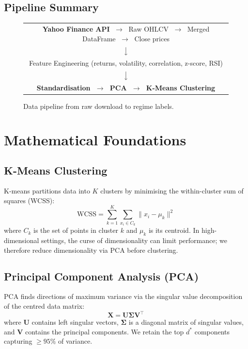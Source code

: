 \documentclass[11pt, a4paper]{article}
\begin{document}
\subsection{Pipeline Summary}

\begin{figure}[H]
\centering
\small
\renewcommand{\arraystretch}{1.2}
\begin{tabular}{c}
\toprule
\textbf{Yahoo Finance API} $\;\to\;$ Raw OHLCV $\;\to\;$ Merged DataFrame $\;\to\;$ Close prices \\
$\big\downarrow$ \\
Feature Engineering (returns, volatility, correlation, z-score, RSI) \\
$\big\downarrow$ \\
\textbf{Standardisation $\;\to\;$ PCA $\;\to\;$ K-Means Clustering} \\
\bottomrule
\end{tabular}
\caption{Data pipeline from raw download to regime labels.}
\label{fig:pipeline}
\end{figure}

\section{Mathematical Foundations}

\subsection{K-Means Clustering}
K-means partitions data into $K$ clusters by minimising the within-cluster sum of squares (WCSS):
\begin{equation}
\label{eq:wcss}
\text{WCSS} = \sum_{k=1}^{K} \sum_{x_i \in C_k} \| x_i - \mu_k \|^2
\end{equation}
where $C_k$ is the set of points in cluster $k$ and $\mu_k$ is its centroid. In high-dimensional settings, the curse of dimensionality can limit performance; we therefore reduce dimensionality via PCA before clustering.

\subsection{Principal Component Analysis (PCA)}
PCA finds directions of maximum variance via the singular value decomposition of the centred data matrix:
\begin{equation}
\label{eq:pca}
\mathbf{X} = \mathbf{U} \mathbf{\Sigma} \mathbf{V}^\top
\end{equation}
where $\mathbf{U}$ contains left singular vectors, $\mathbf{\Sigma}$ is a diagonal matrix of singular values, and $\mathbf{V}$ contains the principal components. We retain the top $d^{*}$ components capturing $\geq 95\%$ of variance.
\end{document}
